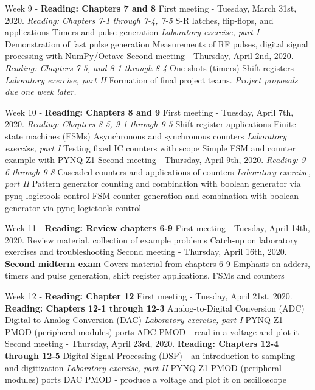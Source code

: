 \documentclass[10pt]{article}
\begin{document}
\begin{outline}[enumerate]
\1 Week 9 - \textbf{Reading: Chapters 7 and 8}
\2 First meeting - Tuesday, March 31st, 2020. \textit{Reading: Chapters 7-1 through 7-4, 7-5}
\3 S-R latches, flip-flops, and applications
\3 Timers and pulse generation
\3 \textit{Laboratory exercise, part I}
\4 Demonstration of fast pulse generation
\4 Measurements of RF pulses, digital signal processing with NumPy/Octave
\2 Second meeting - Thursday, April 2nd, 2020. \textit{Reading: Chapters 7-5, and 8-1 through 8-4}
\3 One-shots (timers)
\3 Shift registers
\3 \textit{Laboratory exercise, part II}
\4 Formation of final project teams.  \textit{Project proposals due one week later.}

\1 Week 10 - \textbf{Reading: Chapters 8 and 9}
\2 First meeting - Tuesday, April 7th, 2020. \textit{Reading: Chapters 8-5, 9-1 through 9-5}
\3 Shift register applications
\3 Finite state machines (FSMs)
\3 Asynchronous and synchronous counters
\3 \textit{Laboratory exercise, part I}
\4 Testing fixed IC counters with scope
\4 Simple FSM and counter example with PYNQ-Z1
\2 Second meeting - Thursday, April 9th, 2020. \textit{Reading: 9-6 through 9-8}
\3 Cascaded counters and applications of counters
\3 \textit{Laboratory exercise, part II}
\4 Pattern generator counting and combination with boolean generator via pynq logictools control
\4 FSM counter generation and combination with boolean generator via pynq logictools control

\1 Week 11 - \textbf{Reading: Review chapters 6-9}
\2 First meeting - Tuesday, April 14th, 2020.
\3 Review material, collection of example problems
\3 Catch-up on laboratory exercises and troubleshooting
\2 Second meeting - Thursday, April 16th, 2020.
\3 \textbf{Second midterm exam}
\4 Covers material from chapters 6-9
\4 Emphasis on adders, timers and pulse generation, shift register applications, FSMs and counters

\1 Week 12 - \textbf{Reading: Chapter 12}
\2 First meeting - Tuesday, April 21st, 2020. \textbf{Reading: Chapters 12-1 through 12-3}
\3 Analog-to-Digital Conversion (ADC)
\3 Digital-to-Analog Conversion (DAC)
\3 \textit{Laboratory exercise, part I}
\4 PYNQ-Z1 PMOD (peripheral modules) ports
\4 ADC PMOD - read in a voltage and plot it
\2 Second meeting - Thursday, April 23rd, 2020. \textbf{Reading: Chapters 12-4 through 12-5}
\3 Digital Signal Processing (DSP) - an introduction to sampling and digitization
\3 \textit{Laboratory exercise, part II}
\4 PYNQ-Z1 PMOD (peripheral modules) ports
\4 DAC PMOD - produce a voltage and plot it on oscilloscope


\end{outline}
\end{document}
